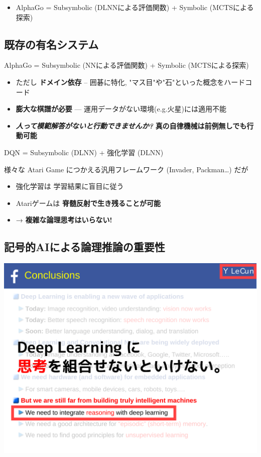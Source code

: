 \begin{itemize}
\item AlphaGo = Subsymbolic (DLNNによる評価関数) + Symbolic (MCTSによる探索)
\end{itemize}

\subsection{既存の有名システム}
\label{sec:orgheadline35}

AlphaGo = Subsymbolic (NNによる評価関数) + Symbolic (MCTSによる探索)
\begin{itemize}
\item ただし \textbf{ドメイン依存} -- 囲碁に特化, "マス目"や"石"といった概念をハードコード
\item \textbf{膨大な棋譜が必要} --- 運用データがない環境(e.g.火星)には適用不能
\item \textbf{\emph{人って模範解答がないと行動できませんか?}} \textbf{真の自律機械は前例無しでも行動可能}
\end{itemize}

DQN = Subsymbolic (DLNN) + 強化学習 (DLNN)

様々な Atari Game につかえる汎用フレームワーク (Invader, Packman…) だが
\begin{itemize}
\item 強化学習は 学習結果に盲目に従う
\item Atariゲームは \textbf{脊髄反射で生き残ることが可能}
\item → \textbf{複雑な論理思考はいらない!}
\end{itemize}

\subsection{記号的AIによる論理推論の重要性}
\label{sec:orgheadline36}

\includegraphics{img/lecun.png}

